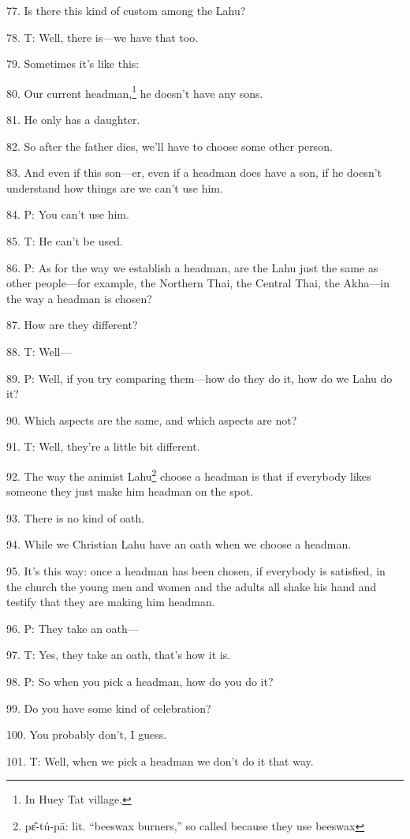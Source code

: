 77. Is there this kind of custom among the Lahu?

78. T: Well, there is---we have that too.

79. Sometimes it's like this:

80. Our current headman,\footnote{In Huey Tat village.} he doesn't have any sons.

81. He only has a daughter.

82. So after the father dies, we'll have to choose some other person.

83. And even if this son---er, even if a headman does have a son, if he doesn't
understand how things are we can't use him.

84. P: You can't use him.

85. T: He can't be used.

86. P: As for the way we establish a headman, are the Lahu just the same as other
people---for example, the Northern Thai, the Central Thai, the Akha---in the way
a headman is chosen?

87. How are they different?

88. T: Well---

89. P: Well, if you try comparing them---how do they do it, how do we Lahu do it?

90. Which aspects are the same, and which aspects are not?

91. T: Well, they're a little bit different.

92. The way the animist Lahu\footnote{pɛ̂-tú-pā: lit. ``beeswax burners,'' so called because they use beeswax} choose a headman is that if everybody likes someone
they just make him headman on the spot.

93. There is no kind of oath.

94. While we Christian Lahu have an oath when we choose a headman.

95. It's this way: once a headman has been chosen, if everybody is satisfied, in
the church the young men and women and the adults all shake his hand and testify
that they are making him headman.

96. P: They take an oath---

97. T: Yes, they take an oath, that's how it is.

98. P: So when you pick a headman, how do you do it?

99. Do you have some kind of celebration?

100. You probably don't, I guess.

101. T: Well, when we pick a headman we don't do it that way.

